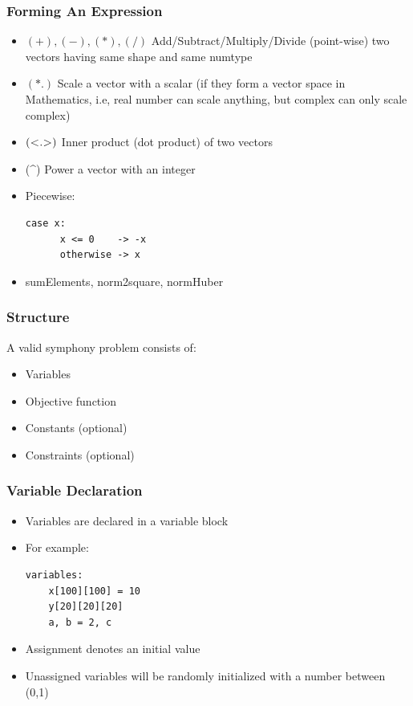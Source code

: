 \documentclass[presentation]{beamer}
\begin{document}
\begin{frame}[fragile]
  \frametitle{Forming An Expression}

  \begin{itemize}
    \item $(+),(-),(*),(/)$ Add/Subtract/Multiply/Divide (point-wise) two vectors having same shape and same numtype
    \item $(*.)$ Scale a vector with a scalar (if they form a vector space in Mathematics, i.e, real number can scale anything, 
    but complex can only scale complex)
    \item $(\textsc{<.>})$ Inner product (dot product) of two vectors 
    \item (\^{}) Power a vector with an integer
    \item Piecewise:
    \begin{lstlisting}[style=Haskell]
    case x:
      x <= 0    -> -x
      otherwise -> x
    \end{lstlisting} 
    \item sumElements, norm2square, normHuber
  \end{itemize}
\end{frame}

\begin{frame}[fragile]
  \frametitle{Structure}
  A valid symphony problem consists of:
  \begin{itemize}
  \item Variables 
  \item Objective function 
  \item Constants (optional)
  \item Constraints (optional)
  \end{itemize}
\end{frame}

\begin{frame}[fragile]
  \frametitle{Variable Declaration}

  \begin{itemize}
  \item Variables are declared in a {\color{red} variable} block
  \item For example:
  \begin{lstlisting}[style=Haskell]
  variables:
    x[100][100] = 10
    y[20][20][20]
    a, b = 2, c
  \end{lstlisting}
  \item Assignment denotes an initial value
  \item Unassigned variables will be randomly initialized with a number between (0,1)
  \end{itemize}
\end{frame}
\end{document}
